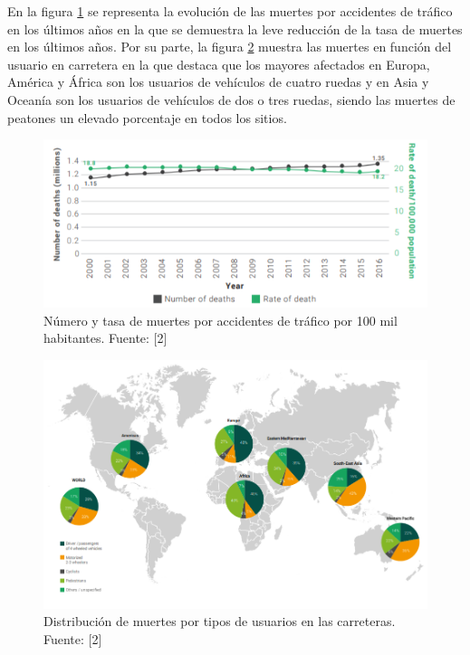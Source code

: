 En la figura \ref{muertes} se representa la evolución de las muertes por accidentes de tráfico en los 
últimos años en la que se demuestra la leve reducción de la tasa de muertes en los últimos 
años. Por su parte, la figura \ref{distribucion} muestra las muertes en función del usuario
en carretera en la que destaca que los mayores afectados en Europa, América y África son 
los usuarios de vehículos de cuatro ruedas y en Asia y Oceanía son los usuarios de vehículos 
de dos o tres ruedas, siendo las muertes de peatones un elevado porcentaje en todos los 
sitios. \cite{who2}

\begin{figure}[ht]
    \centering
    \includegraphics[scale=0.85]{./figuras/muertes_accidentes.png}
    \caption{\small{Número y tasa de muertes por accidentes de tráfico por 100 mil habitantes. Fuente: [2] }}
    \label{muertes}%
\end{figure}

\begin{figure}[h]
    \centering
    \includegraphics[scale=0.575]{./figuras/distribucion.png}
    \caption{\small{Distribución de muertes por tipos de usuarios en las carreteras. Fuente: [2] }}
    \label{distribucion}%
\end{figure}

